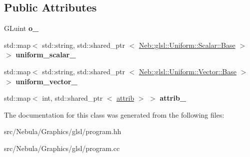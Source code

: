 \subsection*{\-Public \-Attributes}
\begin{DoxyCompactItemize}
\item 
\hypertarget{classNeb_1_1glsl_1_1program_ae5eb6255fdb52393d6ba5ef6154a6004}{\-G\-Luint {\bfseries o\-\_\-}}\label{classNeb_1_1glsl_1_1program_ae5eb6255fdb52393d6ba5ef6154a6004}

\item 
\hypertarget{classNeb_1_1glsl_1_1program_a96ae6982bdd2fe9b7609e4e8a5009733}{std\-::map$<$ std\-::string, \*
std\-::shared\-\_\-ptr\*
$<$ \hyperlink{classNeb_1_1glsl_1_1Uniform_1_1Scalar_1_1Base}{\-Neb\-::glsl\-::\-Uniform\-::\-Scalar\-::\-Base} $>$ $>$ {\bfseries uniform\-\_\-scalar\-\_\-}}\label{classNeb_1_1glsl_1_1program_a96ae6982bdd2fe9b7609e4e8a5009733}

\item 
\hypertarget{classNeb_1_1glsl_1_1program_aaa98c3730eaf9b9f02b7b9d056acb7c3}{std\-::map$<$ std\-::string, \*
std\-::shared\-\_\-ptr\*
$<$ \hyperlink{classNeb_1_1glsl_1_1Uniform_1_1Vector_1_1Base}{\-Neb\-::glsl\-::\-Uniform\-::\-Vector\-::\-Base} $>$ $>$ {\bfseries uniform\-\_\-vector\-\_\-}}\label{classNeb_1_1glsl_1_1program_aaa98c3730eaf9b9f02b7b9d056acb7c3}

\item 
\hypertarget{classNeb_1_1glsl_1_1program_ae5f072f077cff9edbac00de231068383}{std\-::map$<$ int, std\-::shared\-\_\-ptr\*
$<$ \hyperlink{classNeb_1_1glsl_1_1attrib}{attrib} $>$ $>$ {\bfseries attrib\-\_\-}}\label{classNeb_1_1glsl_1_1program_ae5f072f077cff9edbac00de231068383}

\end{DoxyCompactItemize}


\-The documentation for this class was generated from the following files\-:\begin{DoxyCompactItemize}
\item 
src/\-Nebula/\-Graphics/glsl/program.\-hh\item 
src/\-Nebula/\-Graphics/glsl/program.\-cc\end{DoxyCompactItemize}
